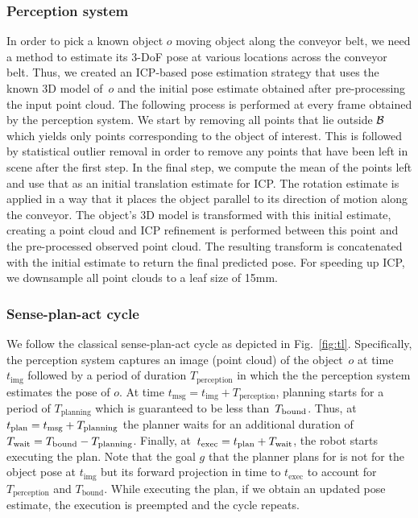\documentclass[a4paper]{report}
\begin{document}
\subsubsection{Perception system}
In order to pick a known object $o$ moving object along the conveyor belt, we need a method to estimate its 3-DoF pose at various locations across the conveyor belt. Thus, we created an ICP-based pose estimation strategy that uses the known 3D model of~$o$ and the initial pose estimate obtained after pre-processing the input point cloud. 
%
The following process is performed at every frame obtained by the perception system. 
We start by removing all points that lie outside $\mathcal{B}$ which yields only points corresponding to the object of interest. 
This is followed by statistical outlier removal in order to remove any points that have been left in scene after the first step. 
In the final step, we compute the mean of the points left and use that as an initial translation estimate for ICP. 
The rotation estimate is applied in a way that it places the object parallel to its direction of motion along the conveyor. The object's 3D model is transformed with this initial estimate, creating a point cloud and ICP refinement is performed between this point and the pre-processed observed point cloud. The resulting transform is concatenated with the initial estimate to return the final predicted pose. For speeding up ICP, we downsample all point clouds to a leaf size of 15mm.

\subsubsection{Sense-plan-act cycle}
We follow the classical sense-plan-act cycle as depicted in Fig.~\ref{fig:tl}.
%
Specifically, 
the perception system captures an image (point cloud) of the object~$o$ at time~$t_{\textrm{img}}$
followed by a period of duration $T_{\textrm{perception}}$ in which the the perception system estimates the pose of $o$.
At time $t_{\textrm{msg}} = t_{\textrm{img}} + T_{\textrm{perception}}$, planning starts for a period of $T_{\textrm{planning}}$ which is guaranteed to be less than~$T_{\textrm{bound}}$.
Thus, at $t_{\textrm{plan}} = t_{\textrm{msg}} + T_{\rm planning}$ the planner waits for an additional duration of $T_{\rm wait} = T_{\textrm{bound}} - T_{\rm planning}$.
Finally, at~$t_{\textrm{exec}} = t_{\textrm{plan}} + T_{\rm wait}$, the robot starts executing the plan. Note that the goal $g$ that the planner plans for is not for the object pose at $t_{\textrm{img}}$ but its forward projection in time to $t_{\textrm{exec}}$ to account for $T_{\textrm{perception}}$ and $T_{\textrm{bound}}$.
While executing the plan, if we obtain an updated pose estimate, the execution is preempted and the cycle repeats.
\end{document}
